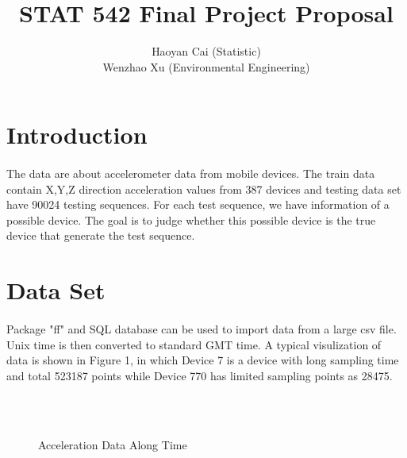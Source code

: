\documentclass{article}
\author{Haoyan Cai (Statistic) \\ Wenzhao Xu (Environmental Engineering)}
\title{STAT 542 Final Project Proposal}
\begin{document}
	\maketitle
	
	\section{Introduction} %
	\label{sec:introduction}
	
	\paragraph{} The data are about accelerometer data from mobile devices. The train data contain X,Y,Z direction acceleration values from 387 devices and testing data set have 90024 testing sequences. For each test sequence, we have information of a possible device. The goal is to judge whether this possible device is the true device that generate the test sequence. 
	
	\section{Data Set} %
	\label{sec:section_name}
	\paragraph{}
	Package "ff" and SQL database can be used to import data from a large csv file. Unix time is then converted to standard GMT time. A typical visulization of data is shown in Figure 1, in which Device 7 is a device with long sampling time and total 523187 points while Device 770 has limited sampling points as 28475.
	\begin{figure}
		\centering
		\\
		 \\
		\caption{Acceleration Data Along Time}
	\end{figure}
	
\end{document}
